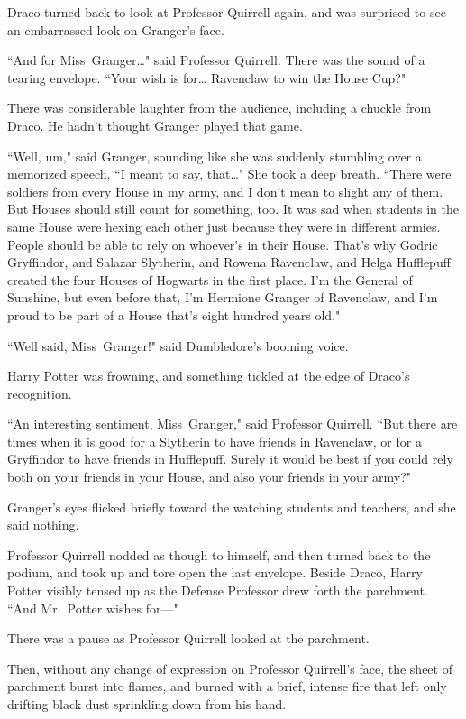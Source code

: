 Draco turned back to look at Professor Quirrell again, and was surprised to see an embarrassed look on Granger's face.

``And for Miss~Granger{\ldots}" said Professor Quirrell. There was the sound of a tearing envelope. ``Your wish is for{\ldots} Ravenclaw to win the House Cup?"

There was considerable laughter from the audience, including a chuckle from Draco. He hadn't thought Granger played that game.

``Well, um," said Granger, sounding like she was suddenly stumbling over a memorized speech, ``I meant to say, that{\ldots}" She took a deep breath. ``There were soldiers from every House in my army, and I don't mean to slight any of them. But Houses should still count for something, too. It was sad when students in the same House were hexing each other just because they were in different armies. People should be able to rely on whoever's in their House. That's why Godric Gryffindor, and Salazar Slytherin, and Rowena Ravenclaw, and Helga Hufflepuff created the four Houses of Hogwarts in the first place. I'm the General of Sunshine, but even before that, I'm Hermione Granger of Ravenclaw, and I'm proud to be part of a House that's eight hundred years old."

``Well said, Miss~Granger!" said Dumbledore's booming voice.

Harry Potter was frowning, and something tickled at the edge of Draco's recognition.

``An interesting sentiment, Miss~Granger," said Professor Quirrell. ``But there are times when it is good for a Slytherin to have friends in Ravenclaw, or for a Gryffindor to have friends in Hufflepuff. Surely it would be best if you could rely both on your friends in your House, and also your friends in your army?"

Granger's eyes flicked briefly toward the watching students and teachers, and she said nothing.

Professor Quirrell nodded as though to himself, and then turned back to the podium, and took up and tore open the last envelope. Beside Draco, Harry Potter visibly tensed up as the Defense Professor drew forth the parchment. ``And Mr.~Potter wishes for—"

There was a pause as Professor Quirrell looked at the parchment.

Then, without any change of expression on Professor Quirrell's face, the sheet of parchment burst into flames, and burned with a brief, intense fire that left only drifting black dust sprinkling down from his hand.

